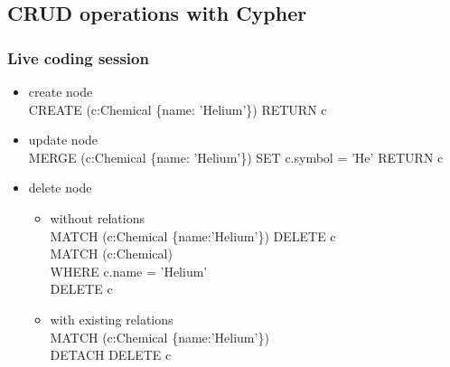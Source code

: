 \documentclass[12pt]{beamer}
\begin{document}
    \subsection{CRUD operations with Cypher}
    \begin{frame}
        \frametitle{Live coding session}
        \begin{itemize}
            \item create node\\
            CREATE (c:Chemical \{name: 'Helium'\}) RETURN c
            \item update node\\
            MERGE (c:Chemical \{name: 'Helium'\}) SET c.symbol = 'He' RETURN c
            \item delete node 
            \begin{itemize}
                \item without relations\\
                MATCH (c:Chemical \{name:'Helium'\}) DELETE c\\
                MATCH (c:Chemical)\\
                \hspace{1cm} WHERE c.name = 'Helium'\\
                \hspace{1cm} DELETE c
                \item with existing relations\\
                MATCH (c:Chemical \{name:'Helium'\})\\
                \hspace{1cm} DETACH DELETE c\\
            \end{itemize}
        \end{itemize}
    \end{frame}
    
\end{document}
